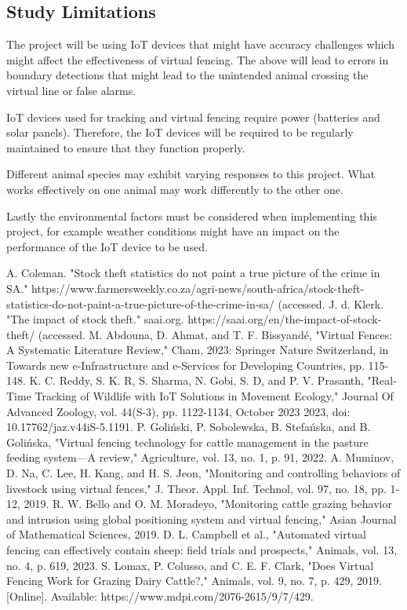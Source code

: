\documentclass[conference]{main}
\begin{document}
\subsection*{Study Limitations}

The project will be using IoT devices that might have accuracy challenges which
might affect the effectiveness of virtual fencing. The above will lead to
errors in boundary detections that might lead to the unintended animal crossing
the virtual line or false alarms.

IoT devices used for tracking and virtual fencing require power (batteries and
solar panels). Therefore, the IoT devices will be required to be regularly
maintained to ensure that they function properly.

Different animal species may exhibit varying responses to this project. What
works effectively on one animal may work differently to the other one.

Lastly the environmental factors must be considered when implementing this
project, for example weather conditions might have an impact on the performance
of the IoT device to be used.

\begin{thebibliography}{00}
	A. Coleman. "Stock theft statistics do not paint a true picture of the crime in SA." https://www.farmersweekly.co.za/agri-news/south-africa/stock-theft-statistics-do-not-paint-a-true-picture-of-the-crime-in-sa/ (accessed.
	J. d. Klerk. "The impact of stock theft." saai.org. https://saai.org/en/the-impact-of-stock-theft/ (accessed.
	M. Abdouna, D. Ahmat, and T. F. Bissyandé, "Virtual Fences: A Systematic Literature Review," Cham, 2023: Springer Nature Switzerland, in Towards new e-Infrastructure and e-Services for Developing Countries, pp. 115-148.
	K. C. Reddy, S. K. R, S. Sharma, N. Gobi, S. D, and P. V. Prasanth, "Real-Time Tracking of Wildlife with IoT Solutions in Movement Ecology," Journal Of Advanced Zoology, vol. 44(S-3), pp. 1122-1134, October 2023 2023, doi: 10.17762/jaz.v44iS-5.1191.
	P. Goliński, P. Sobolewska, B. Stefańska, and B. Golińska, "Virtual fencing technology for cattle management in the pasture feeding system—A review," Agriculture, vol. 13, no. 1, p. 91, 2022.
	A. Muminov, D. Na, C. Lee, H. Kang, and H. S. Jeon, "Monitoring and controlling behaviors of livestock using virtual fences," J. Theor. Appl. Inf. Technol, vol. 97, no. 18, pp. 1-12, 2019.
	R. W. Bello and O. M. Moradeyo, "Monitoring cattle grazing behavior and intrusion using global positioning system and virtual fencing," Asian Journal of Mathematical Sciences, 2019.
	D. L. Campbell et al., "Automated virtual fencing can effectively contain sheep: field trials and prospects," Animals, vol. 13, no. 4, p. 619, 2023.
	S. Lomax, P. Colusso, and C. E. F. Clark, "Does Virtual Fencing Work for Grazing Dairy Cattle?," Animals, vol. 9, no. 7, p. 429, 2019. [Online]. Available: https://www.mdpi.com/2076-2615/9/7/429.
\end{thebibliography}
\end{document}
